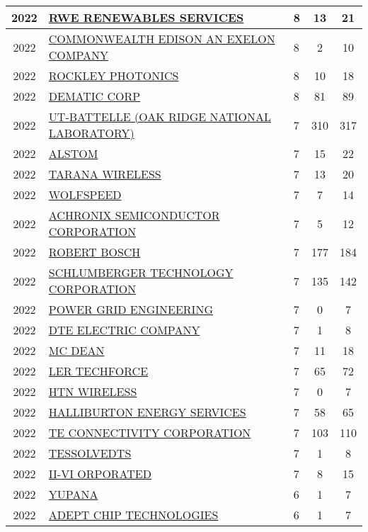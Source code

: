 \documentclass{article}%
\begin{document}
\begin{longtable}{c|p{20em}|p{5em}|c|c}
\hline%
2022&\hyperref[subsec:RWERENEWABLESSERVICES]{RWE RENEWABLES SERVICES}&8&13&21\\%
\hline%
2022&\hyperref[subsec:COMMONWEALTHEDISONANEXELONCOMPANY]{COMMONWEALTH EDISON AN EXELON COMPANY}&8&2&10\\%
\hline%
2022&\hyperref[subsec:ROCKLEYPHOTONICS]{ROCKLEY PHOTONICS}&8&10&18\\%
\hline%
2022&\hyperref[subsec:DEMATICCORP]{DEMATIC CORP}&8&81&89\\%
\hline%
2022&\hyperref[subsec:UT{-}BATTELLE(OAKRIDGENATIONALLABORATORY)]{UT{-}BATTELLE  (OAK RIDGE NATIONAL LABORATORY)}&7&310&317\\%
\hline%
2022&\hyperref[subsec:ALSTOM]{ALSTOM}&7&15&22\\%
\hline%
2022&\hyperref[subsec:TARANAWIRELESS]{TARANA WIRELESS}&7&13&20\\%
\hline%
2022&\hyperref[subsec:WOLFSPEED]{WOLFSPEED}&7&7&14\\%
\hline%
2022&\hyperref[subsec:ACHRONIXSEMICONDUCTORCORPORATION]{ACHRONIX SEMICONDUCTOR CORPORATION}&7&5&12\\%
\hline%
2022&\hyperref[subsec:ROBERTBOSCH]{ROBERT BOSCH}&7&177&184\\%
\hline%
2022&\hyperref[subsec:SCHLUMBERGERTECHNOLOGYCORPORATION]{SCHLUMBERGER TECHNOLOGY CORPORATION}&7&135&142\\%
\hline%
2022&\hyperref[subsec:POWERGRIDENGINEERING]{POWER GRID ENGINEERING}&7&0&7\\%
\hline%
2022&\hyperref[subsec:DTEELECTRICCOMPANY]{DTE ELECTRIC COMPANY}&7&1&8\\%
\hline%
2022&\hyperref[subsec:MCDEAN]{MC DEAN}&7&11&18\\%
\hline%
2022&\hyperref[subsec:LERTECHFORCE]{LER TECHFORCE}&7&65&72\\%
\hline%
2022&\hyperref[subsec:HTNWIRELESS]{HTN WIRELESS}&7&0&7\\%
\hline%
2022&\hyperref[subsec:HALLIBURTONENERGYSERVICES]{HALLIBURTON ENERGY SERVICES}&7&58&65\\%
\hline%
2022&\hyperref[subsec:TECONNECTIVITYCORPORATION]{TE CONNECTIVITY CORPORATION}&7&103&110\\%
\hline%
2022&\hyperref[subsec:TESSOLVEDTS]{TESSOLVEDTS}&7&1&8\\%
\hline%
2022&\hyperref[subsec:II{-}VIORPORATED]{II{-}VI ORPORATED}&7&8&15\\%
\hline%
2022&\hyperref[subsec:YUPANA]{YUPANA}&6&1&7\\%
\hline%
2022&\hyperref[subsec:ADEPTCHIPTECHNOLOGIES]{ADEPT CHIP TECHNOLOGIES}&6&1&7\\%

\end{longtable}
\end{document}

